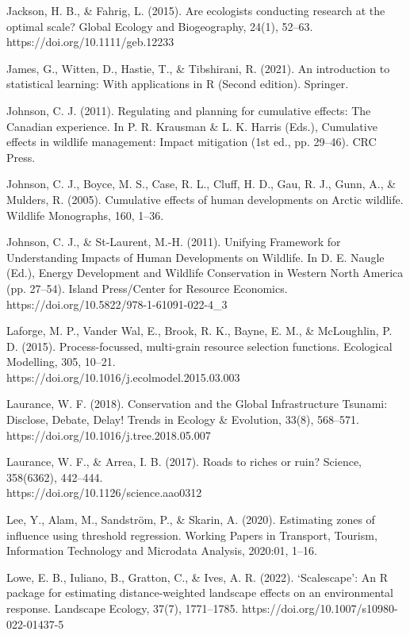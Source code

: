 \documentclass[titlepage]{article}
\begin{document}
Jackson, H. B., & Fahrig, L. (2015). Are ecologists conducting research at the optimal scale? Global Ecology and Biogeography, 24(1), 52–63. https://doi.org/10.1111/geb.12233

James, G., Witten, D., Hastie, T., & Tibshirani, R. (2021). An introduction to statistical learning: With applications in R (Second edition). Springer.

Johnson, C. J. (2011). Regulating and planning for cumulative effects: The Canadian experience. In P. R. Krausman & L. K. Harris (Eds.), Cumulative effects in wildlife management: Impact mitigation (1st ed., pp. 29–46). CRC Press.

Johnson, C. J., Boyce, M. S., Case, R. L., Cluff, H. D., Gau, R. J., Gunn, A., & Mulders, R. (2005). Cumulative effects of human developments on Arctic wildlife. Wildlife Monographs, 160, 1–36.

Johnson, C. J., & St-Laurent, M.-H. (2011). Unifying Framework for Understanding Impacts of Human Developments on Wildlife. In D. E. Naugle (Ed.), Energy Development and Wildlife Conservation in Western North America (pp. 27–54). Island Press/Center for Resource Economics.\\ https://doi.org/10.5822/978-1-61091-022-4_3

Laforge, M. P., Vander Wal, E., Brook, R. K., Bayne, E. M., & McLoughlin, P. D. (2015). Process-focussed, multi-grain resource selection functions. Ecological Modelling, 305, 10–21.\\ https://doi.org/10.1016/j.ecolmodel.2015.03.003

Laurance, W. F. (2018). Conservation and the Global Infrastructure Tsunami: Disclose, Debate, Delay! Trends in Ecology & Evolution, 33(8), 568–571. https://doi.org/10.1016/j.tree.2018.05.007

Laurance, W. F., & Arrea, I. B. (2017). Roads to riches or ruin? Science, 358(6362), 442–444. \\
https://doi.org/10.1126/science.aao0312

Lee, Y., Alam, M., Sandström, P., & Skarin, A. (2020). Estimating zones of influence using threshold regression. Working Papers in Transport, Tourism, Information Technology and Microdata Analysis, 2020:01, 1–16.

Lowe, E. B., Iuliano, B., Gratton, C., & Ives, A. R. (2022). ‘Scalescape’: An R package for estimating distance-weighted landscape effects on an environmental response. Landscape Ecology, 37(7), 1771–1785. https://doi.org/10.1007/s10980-022-01437-5
\end{document}
